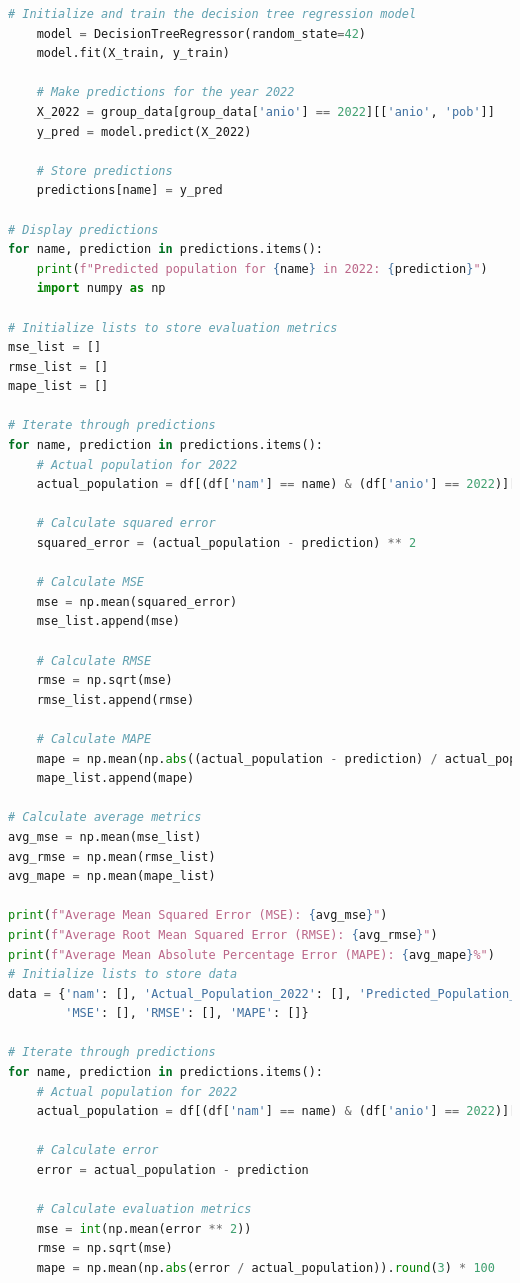 \documentclass{article}
\theoremstyle{mytheoremstyle}
\theoremstyle{mytheoremstyle}
\theoremstyle{myproblemstyle}
\begin{document}
\begin{lstlisting}[language=Python, caption=Random Forest.ipynb,label={lst:RANDOMT.ipynb}]
    # Initialize and train the decision tree regression model
    model = DecisionTreeRegressor(random_state=42)
    model.fit(X_train, y_train)
    
    # Make predictions for the year 2022
    X_2022 = group_data[group_data['anio'] == 2022][['anio', 'pob']]
    y_pred = model.predict(X_2022)
    
    # Store predictions
    predictions[name] = y_pred

# Display predictions
for name, prediction in predictions.items():
    print(f"Predicted population for {name} in 2022: {prediction}")
    import numpy as np

# Initialize lists to store evaluation metrics
mse_list = []
rmse_list = []
mape_list = []

# Iterate through predictions
for name, prediction in predictions.items():
    # Actual population for 2022
    actual_population = df[(df['nam'] == name) & (df['anio'] == 2022)]['pob'].values[0]
    
    # Calculate squared error
    squared_error = (actual_population - prediction) ** 2
    
    # Calculate MSE
    mse = np.mean(squared_error)
    mse_list.append(mse)
    
    # Calculate RMSE
    rmse = np.sqrt(mse)
    rmse_list.append(rmse)
    
    # Calculate MAPE
    mape = np.mean(np.abs((actual_population - prediction) / actual_population)) * 100
    mape_list.append(mape)

# Calculate average metrics
avg_mse = np.mean(mse_list)
avg_rmse = np.mean(rmse_list)
avg_mape = np.mean(mape_list)

print(f"Average Mean Squared Error (MSE): {avg_mse}")
print(f"Average Root Mean Squared Error (RMSE): {avg_rmse}")
print(f"Average Mean Absolute Percentage Error (MAPE): {avg_mape}%")
# Initialize lists to store data
data = {'nam': [], 'Actual_Population_2022': [], 'Predicted_Population_2022': [], 'Error': [],
        'MSE': [], 'RMSE': [], 'MAPE': []}

# Iterate through predictions
for name, prediction in predictions.items():
    # Actual population for 2022
    actual_population = df[(df['nam'] == name) & (df['anio'] == 2022)]['pob'].values
    
    # Calculate error
    error = actual_population - prediction
    
    # Calculate evaluation metrics
    mse = int(np.mean(error ** 2))
    rmse = np.sqrt(mse)
    mape = np.mean(np.abs(error / actual_population)).round(3) * 100
    

\end{lstlisting}
\end{document}
